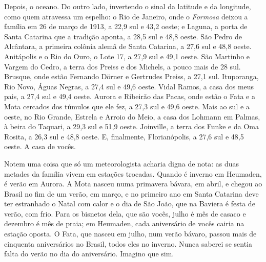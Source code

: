 \documentclass[
  brazilian,
  11pt,
  openany]{book}
\begin{document}
Depois, o oceano. Do outro lado, invertendo o sinal da latitude e da
longitude, como quem atravessa um espelho: o Rio de Janeiro, onde o
\emph{Formosa} deixou a família em 26 de março de 1913, a 22,9 sul e
43,2 oeste; e Laguna, a porta de Santa Catarina que a tradição aponta, a
28,5 sul e 48,8 oeste. São Pedro de Alcântara, a primeira colônia alemã
de Santa Catarina, a 27,6 sul e 48,8 oeste. Anitápolis e o Rio do Ouro,
o Lote 17, a 27,9 sul e 49,1 oeste. São Martinho e Vargem do Cedro, a
terra dos Preiss e dos Michels, a pouco mais de 28 sul. Brusque, onde
estão Fernando Dörner e Gertrudes Preiss, a 27,1 sul. Ituporanga, Rio
Novo, Águas Negras, a 27,4 sul e 49,6 oeste. Vidal Ramos, a casa dos
meus pais, a 27,4 sul e 49,4 oeste. Aurora e Ribeirão das Pacas, onde
estão o Fata e a Mota cercados dos túmulos que ele fez, a 27,3 sul e
49,6 oeste. Mais ao sul e a oeste, no Rio Grande, Estrela e Arroio do
Meio, a casa dos Lohmann em Palmas, à beira do Taquari, a 29,3 sul e
51,9 oeste. Joinville, a terra dos Funke e da Oma Rosita, a 26,3 sul e
48,8 oeste. E, finalmente, Florianópolis, a 27,6 sul e 48,5 oeste. A
casa de vocês.

Notem uma coisa que só um meteorologista acharia digna de nota: as duas
metades da família vivem em estações trocadas. Quando é inverno em
Heumaden, é verão em Aurora. A Mota nasceu numa primavera bávara, em
abril, e chegou ao Brasil no fim de um verão, em março, e no primeiro
ano em Santa Catarina deve ter estranhado o Natal com calor e o dia de
São João, que na Baviera é festa de verão, com frio. Para os bisnetos
dela, que são vocês, julho é mês de casaco e dezembro é mês de praia; em
Heumaden, cada aniversário de vocês cairia na estação oposta. O Fata,
que nasceu em julho, num verão bávaro, passou mais de cinquenta
aniversários no Brasil, todos eles no inverno. Nunca saberei se sentia
falta do verão no dia do aniversário. Imagino que sim.
\end{document}
